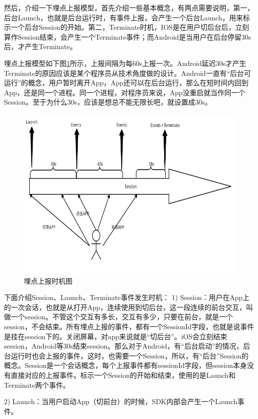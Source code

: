 然后，介绍一下埋点上报模型，首先介绍一些基本概念，有两点需要说明，第一，后台Launch，也就是后台运行时，有事件上报，会产生一个后台Launch，用来标示一个后台Session的开始。第二，Terminate时机，IOS是在用户切后台后，立刻算作Session结束，会产生一个Terminate事件；而Android是当用户在后台停留30s后，才产生Terminate。

埋点上报模型如下图\ref{maidanshiji}所示，上报间隔为每60s上报一次。Android延迟30s才产生Terminate的原因应该是某个程序员从技术角度做的设计。Android一直有“后台可运行”的概念，用户暂时离开App，App还可以在后台运行，那么在短时间内回到App，还是同一个进程。同一个进程，对程序员来说，App没重启就当作同一个Session。至于为什么30s，应该是想总不能无限长吧，就设置成30s。
 \begin{figure}[htb]
  \centering
  \includegraphics[width=5in]{figure/chapter4/埋点上报时机图.jpg}
  \caption{埋点上报时机图}\label{maidanshiji}
\end{figure}

下面介绍Session、Launch、Terminate事件发生时机：
1)	Session：用户在App上的一次会话，也就是从打开App，连续使用到切后台，这一段连续的前台交互，叫做一个session。不管这个交互有多长，交互有多少，只要在前台，就是一个session，不会结束。所有埋点上报的事件，都有一个SessionId字段，也就是说事件是挂在session下的。关闭屏幕，对app来说就是“切后台”。iOS会立刻结束session，Android等30s结束session。那么对于Android，有“后台启动”的情况，后台运行时也会上报的事件，这时，也需要一个Session，所以，有“后台”Session的概念。Session是一个会话概念，每个上报事件都有sessionId字段，但session本身没有直接对应的上报事件。标示一个Session的开始和结束，使用的是Launch和Terminate两个事件。

2)	Launch：当用户启动App（切前台）的时候，SDK内部会产生一个Launch事件。

